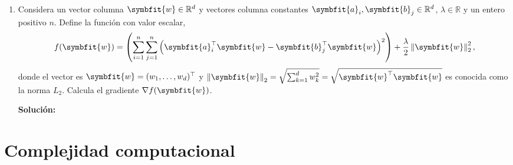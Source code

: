 \documentclass[11pt,letterpaper]{article}
\newenvironment{solution}{%
  \noindent\begin{shaded}
  \textbf{Solución:}\ }{
  \end{shaded}%
}
\newcommand{\bvec}[1]{\symbfit{#1}}
\newcommand{\norm}[1]{\left\lVert#1\right\rVert}
\begin{document}
\begin{enumerate}
\begin{solution}
Queremos demostrar que $P(A) > \frac{1}{6}$.

Vamos a usar la regla de la probabilidad total:
\begin{align*}
    P(A \cup B) &= P(A \cap B) + P(A \cap B') \\
    \frac{1}{3} &= P(A \cap B) + (1 - P(A|B)) \cdot (1 - P(B)).
\end{align*}

Después, utilizaremos la simetría de la probabilidad condicional para $P(A \cap B')$:
\begin{align*}
    \frac{1}{3} &= P(A \cap B) + (1 - P(A|B)) \cdot (1 - P(B)) \\
    P(A) &= P(A|B) \cdot P(B) + (1 - P(A|B)) \cdot (1 - P(B)).\end{align*}

  \end{solution}
  
\item%
  Considera un vector columna \(\bvec{w}\in\mathbb{R}^d\) y vectores
  columna constantes \(\bvec{a}_i,\bvec{b}_j\in\mathbb{R}^d\),
  \(\lambda\in\mathbb{R}\) y un entero positivo \(n\).  Define la
  función con valor escalar,
  \[ f(\bvec{w})=\left(\sum_{i=1}^n\sum_{j=1}^n\left(\bvec{a}_i^\top\bvec{w}-\bvec{b}_j^\top\bvec{w}\right)^2\right)+\frac{\lambda}{2}\norm{\bvec{w}}_2^2, \]
  donde el vector es \(\bvec{w} = (w_1,\dots,w_d)^\top\) y
  \(\norm{\bvec{w}}_2 = \sqrt{\sum_{k=1}^d w_k^2} =
  \sqrt{\bvec{w}^\top\bvec{w}}\) es conocida como la norma \(L_2\).
  Calcula el gradiente \(\nabla f(\bvec{w})\).
  \begin{solution}
  \end{solution}
\end{enumerate}



\section*{Complejidad computacional}
\end{document}
